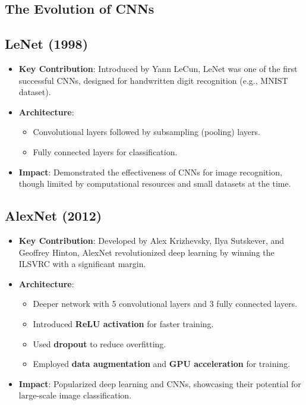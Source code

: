 \begin{notechapter}
\chapter{The Evolution of CNNs}\label{ch:cnn-evolution}

\section{LeNet (1998)}
\begin{itemize}
  \item \textbf{Key Contribution}: Introduced by Yann LeCun, LeNet was 
    one of the first successful CNNs, designed for handwritten digit 
    recognition (e.g., MNIST dataset).
  \item \textbf{Architecture}:
    \begin{itemize}
      \item Convolutional layers followed by subsampling (pooling) 
        layers.
      \item Fully connected layers for classification.
    \end{itemize}
  \item \textbf{Impact}: Demonstrated the effectiveness of CNNs for 
    image recognition, though limited by computational resources and 
    small datasets at the time.
\end{itemize}

\section{AlexNet (2012)}
\begin{itemize}
  \item \textbf{Key Contribution}: Developed by Alex Krizhevsky, Ilya 
    Sutskever, and Geoffrey Hinton, AlexNet revolutionized deep 
    learning by winning the ILSVRC with a significant margin.
  \item \textbf{Architecture}:
    \begin{itemize}
      \item Deeper network with 5 convolutional layers and 3 fully 
        connected layers.
      \item Introduced \textbf{ReLU activation} for faster training.
      \item Used \textbf{dropout} to reduce overfitting.
      \item Employed \textbf{data augmentation} and \textbf{GPU 
        acceleration} for training.
    \end{itemize}
  \item \textbf{Impact}: Popularized deep learning and CNNs, showcasing 
    their potential for large-scale image classification.
\end{itemize}


\end{notechapter}
